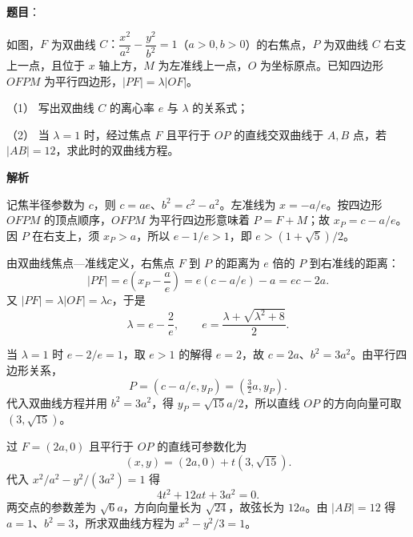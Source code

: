 \begin{answer}

\textbf{题目}：

如图，$F$ 为双曲线 $C\text{：}\dfrac{x^2}{a^2}-\dfrac{y^2}{b^2}=1$（$a>0,b>0$）的右焦点，$P$ 为双曲线 $C$ 右支上一点，且位于 $x$ 轴上方，$M$ 为左准线上一点，$O$ 为坐标原点。已知四边形 $OFPM$ 为平行四边形，$|PF|=\lambda|OF|$。

（1） 写出双曲线 $C$ 的离心率 $e$ 与 $\lambda$ 的关系式；

（2） 当 $\lambda=1$ 时，经过焦点 $F$ 且平行于 $OP$ 的直线交双曲线于 $A,B$ 点，若 $|AB|=12$，求此时的双曲线方程。
\nopagebreak[4]
\begin{center}\end{center}
\nopagebreak[4]
\textbf{解析}


记焦半径参数为 $c$，则 $c=ae$、$b^2=c^2-a^2$。左准线为 $x=-a/e$。按四边形 $OFPM$ 的顶点顺序，$OFPM$ 为平行四边形意味着 $P=F+M$；故 $x_P=c-a/e$。因 $P$ 在右支上，须 $x_P>a$，所以 $e-1/e>1$，即 $e>(1+\sqrt5)/2$。

由双曲线焦点—准线定义，右焦点 $F$ 到 $P$ 的距离为 $e$ 倍的 $P$ 到右准线的距离：
\nopagebreak[4]
\[
|PF|=e\left(x_P-\frac ae\right)=e(c-a/e)-a=ec-2a.
\]
又 $|PF|=\lambda|OF|=\lambda c$，于是
\nopagebreak[4]
\[
\lambda=e-\frac2e,\qquad
e=\frac{\lambda+\sqrt{\lambda^2+8}}2.
\]


当 $\lambda=1$ 时 $e-2/e=1$，取 $e>1$ 的解得 $e=2$，故 $c=2a$、$b^2=3a^2$。由平行四边形关系，
\nopagebreak[4]
\[
P=(c-a/e,y_P)=(\tfrac32a,y_P).
\]
代入双曲线方程并用 $b^2=3a^2$，得 $y_P=\sqrt{15}a/2$，所以直线 $OP$ 的方向向量可取 $(3,\sqrt{15})$。

过 $F=(2a,0)$ 且平行于 $OP$ 的直线可参数化为
\nopagebreak[4]
\[
(x,y)=(2a,0)+t(3,\sqrt{15}).
\]
代入 $x^2/a^2-y^2/(3a^2)=1$ 得
\nopagebreak[4]
\[
4t^2+12at+3a^2=0.
\]
两交点的参数差为 $\sqrt6a$，方向向量长为 $\sqrt{24}$，故弦长为 $12a$。由 $|AB|=12$ 得 $a=1$、$b^2=3$，所求双曲线方程为 $x^2-y^2/3=1$。



\end{answer}